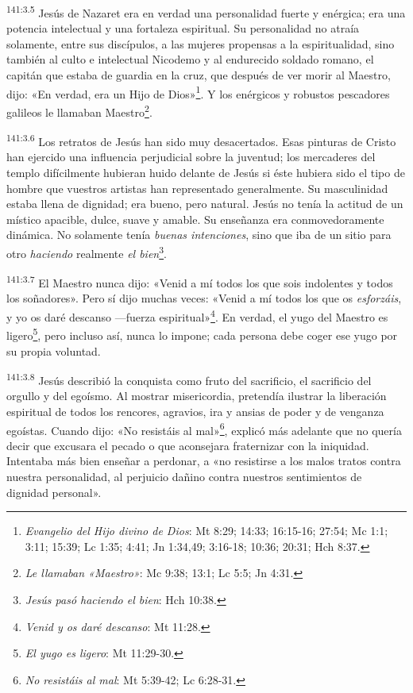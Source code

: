 \par
\textsuperscript{141:3.5} Jesús de Nazaret era en verdad una personalidad fuerte y enérgica; era una potencia intelectual y una fortaleza espiritual. Su personalidad no atraía solamente, entre sus discípulos, a las mujeres propensas a la espiritualidad, sino también al culto e intelectual Nicodemo y al endurecido soldado romano, el capitán que estaba de guardia en la cruz, que después de ver morir al Maestro, dijo: «En verdad, era un Hijo de Dios»\footnote{\textit{Evangelio del Hijo divino de Dios}: Mt 8:29; 14:33; 16:15-16; 27:54; Mc 1:1; 3:11; 15:39; Lc 1:35; 4:41; Jn 1:34,49; 3:16-18; 10:36; 20:31; Hch 8:37.}. Y los enérgicos y robustos pescadores galileos le llamaban Maestro\footnote{\textit{Le llamaban «Maestro»}: Mc 9:38; 13:1; Lc 5:5; Jn 4:31.}.

\par
\textsuperscript{141:3.6} Los retratos de Jesús han sido muy desacertados. Esas pinturas de Cristo han ejercido una influencia perjudicial sobre la juventud; los mercaderes del templo difícilmente hubieran huido delante de Jesús si éste hubiera sido el tipo de hombre que vuestros artistas han representado generalmente. Su masculinidad estaba llena de dignidad; era bueno, pero natural. Jesús no tenía la actitud de un místico apacible, dulce, suave y amable. Su enseñanza era conmovedoramente dinámica. No solamente tenía \textit{buenas intenciones}, sino que iba de un sitio para otro \textit{haciendo} realmente \textit{el bien}\footnote{\textit{Jesús pasó haciendo el bien}: Hch 10:38.}.

\par
\textsuperscript{141:3.7} El Maestro nunca dijo: «Venid a mí todos los que sois indolentes y todos los soñadores». Pero sí dijo muchas veces: «Venid a mí todos los que os \textit{esforzáis}, y yo os daré descanso ---fuerza espiritual»\footnote{\textit{Venid y os daré descanso}: Mt 11:28.}. En verdad, el yugo del Maestro es ligero\footnote{\textit{El yugo es ligero}: Mt 11:29-30.}, pero incluso así, nunca lo impone; cada persona debe coger ese yugo por su propia voluntad.

\par
\textsuperscript{141:3.8} Jesús describió la conquista como fruto del sacrificio, el sacrificio del orgullo y del egoísmo. Al mostrar misericordia, pretendía ilustrar la liberación espiritual de todos los rencores, agravios, ira y ansias de poder y de venganza egoístas. Cuando dijo: «No resistáis al mal»\footnote{\textit{No resistáis al mal}: Mt 5:39-42; Lc 6:28-31.}, explicó más adelante que no quería decir que excusara el pecado o que aconsejara fraternizar con la iniquidad. Intentaba más bien enseñar a perdonar, a «no resistirse a los malos tratos contra nuestra personalidad, al perjuicio dañino contra nuestros sentimientos de dignidad personal».

